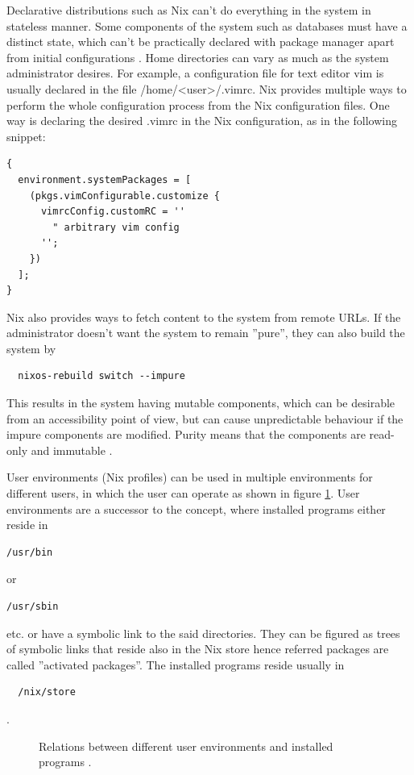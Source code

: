Declarative distributions such as Nix can't do everything in the
system in stateless manner. Some components of the system such as
databases must have a distinct state, which can't be practically
declared with package manager apart from initial configurations
\cite{van2013reference}. Home directories can vary as much as the
system administrator desires. For example, a configuration file for
text editor vim is usually declared in the file
/home/<user>/.vimrc. Nix provides multiple ways to perform the whole
configuration process from the Nix configuration files. One way is
declaring the desired .vimrc in the Nix configuration, as in the
following snippet:

\begin{lstlisting}
{
  environment.systemPackages = [
    (pkgs.vimConfigurable.customize {
      vimrcConfig.customRC = ''
        " arbitrary vim config
      '';
    })
  ];
}
\end{lstlisting}
Nix also provides ways to fetch content to the system from
remote URLs. If the administrator doesn't want the system to
remain ''pure'', they can also build the system by
\begin{lstlisting}
  nixos-rebuild switch --impure
\end{lstlisting}
This results in the system having mutable components, which can be
desirable from an accessibility point of view, but can cause
unpredictable behaviour if the impure components are modified. Purity means that the components are read-only and
immutable \cite{dolstra2010nixos}.

User environments (Nix profiles) can be used in multiple environments for different users, in which the user can operate as shown in figure  \ref{userenvs}. User
environments are a successor to the concept, where installed programs
either reside in
\begin{lstlisting}
/usr/bin
\end{lstlisting}
or
\begin{lstlisting}
/usr/sbin
\end{lstlisting}
etc. or have a symbolic link to
the said directories. They can be figured as trees of symbolic links
that reside also in the Nix store hence referred packages are called
''activated packages''. The installed programs reside usually in
\begin{lstlisting}
  /nix/store
\end{lstlisting}. \cite{dolstra2008nixos}

\begin{figure}[t!]
\centerline{}
\caption{Relations between different user environments and installed
  programs \cite{nixosUserEnvironment}.}
\label{userenvs}
\end{figure}

